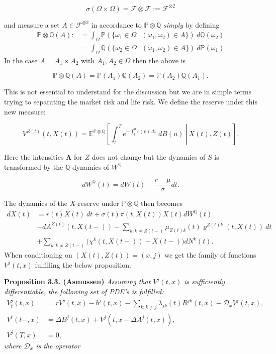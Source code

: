\documentclass[a4paper,12pt,openany]{book}
\begin{document}
\[
\sigma(\Omega\times\Omega)=\mathcal F \otimes \mathcal F:=\mathcal F^{\otimes2}
\]

and measure a set \(A\in \mathcal F^{\otimes2}\) in accordance to \(\mathbb P\otimes \mathbb Q\) \emph{simply} by defining
\begin{align*}
\mathbb P\otimes \mathbb Q(A):&=\int_\Omega \mathbb P(\{\omega_1 \in \Omega\ \vert\ (\omega_1,\omega_2) \in A\})\ d\mathbb Q(\omega_2)\\
&=\int_\Omega \mathbb Q(\{\omega_2 \in \Omega\ \vert\ (\omega_1,\omega_2) \in A\})\ d\mathbb P(\omega_1)
\end{align*}
In the case \(A=A_1\times A_2\) with \(A_1,A_2\in \Omega\) then the above is

\[
\mathbb P\otimes \mathbb Q(A)=\mathbb P(A_1)\mathbb Q(A_2)=\mathbb P(A_2)\mathbb Q(A_1).
\]

This is not essential to understand for the discussion but we are in simple terms trying to separating the market risk and life risk. We define the reserve under this new measure:

\[
V^{Z(t)}(t,X(t))=\mathbb E^{\mathbb P\otimes\mathbb Q}\left[\left. \int_t^Te^{-\int_t^u r(v)\ dv}\ dB(u)\ \right\vert\ X(t),Z(t)\right].
\]

Here the intensities \(\mathbf \Lambda\) for \(Z\) does not change but the dynamics of \(S\) is transformed by the \(\mathbb Q\)-dynamics of \(W^\mathbb Q\)

\[
dW^\mathbb Q(t)=dW(t)-\frac{r-\mu}{\sigma}dt.
\]

The dynamics of the \(X\)-reserve under \(\mathbb P\otimes \mathbb Q\) then becomes
\begin{align*}
dX(t)&=r(t)X(t)\ dt+\sigma(t)\pi(t,X(t))X(t)dW^\mathbb Q(t)\\
&-dA^{Z(t)}(t,X(t-))-\sum_{k:k\ne Z(t-)}\mu_{Z(t)k}(t) \varrho^{Z(t)k}(t,X(t))\ dt\\
&+\sum_{k:k\ne Z(t-)}\Big(\chi^k(t,X(t-))-X(t-)\Big)dN^k(t).
\end{align*}
When conditioning on \((X(t),Z(t))=(x,j)\) we get the family of functions \(V^j(t,x)\) fulfilling the below proposition.

\textbf{Proposition 3.3. (Asmussen)} \emph{Assuming that \(V^j(t,x)\) is sufficiently differentiable, the following set of PDE's is fulfilled:}
\begin{align*}
V_t^j(t,x)&=rV^j(t,x)-b^j(t,x)-\sum_{k:k\ne j}\lambda_{jk}(t)R^{jk}(t,x)-\mathcal D_x V^j(t,x),\\
V^t(t-,x)&=\Delta B^j(t,x)+V^j(t,x-\Delta A^j(t,x)),\\
V^j(T,x)&=0,
\end{align*}
\emph{where \(\mathcal D_x\) is the operator}
\end{document}
